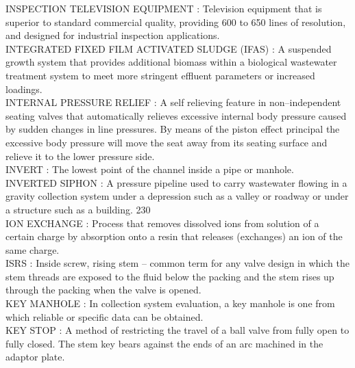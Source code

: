 \vspace{0.15cm}
INSPECTION TELEVISION EQUIPMENT :  Television equipment that is superior to standard commercial quality, providing 600 to 650 lines of resolution, and designed for industrial inspection applications. \\
\vspace{0.15cm}
INTEGRATED FIXED FILM ACTIVATED SLUDGE (IFAS) :   A suspended growth system that provides additional biomass within a biological wastewater treatment system to meet more stringent effluent parameters or increased loadings.\\
\vspace{0.15cm}
INTERNAL PRESSURE RELIEF :   A self relieving feature in non–independent seating valves that automatically relieves excessive internal body pressure caused by sudden changes in line pressures. By means of the piston effect principal the excessive body pressure will move the seat away from its seating surface and relieve it to the lower pressure side.\\
\vspace{0.15cm}
INVERT :  The lowest point of the channel inside a pipe or manhole. \\
\vspace{0.15cm}
INVERTED SIPHON :  A pressure pipeline used to carry wastewater flowing in a gravity collection system under a depression such as a valley or roadway or under a structure such as a building. 230 \\
\vspace{0.15cm}
ION EXCHANGE :  Process that removes dissolved ions from solution of a certain charge by absorption onto a resin that releases (exchanges) an ion of the same charge.\\
\vspace{0.15cm}
ISRS :   Inside screw, rising stem – common term for any valve design in which the stem threads are exposed to the fluid below the packing and the stem rises up through the packing when the valve is opened.\\
\vspace{0.15cm}
KEY MANHOLE :  In collection system evaluation, a key manhole is one from which reliable or specific data can be obtained. \\
\vspace{0.15cm}
KEY STOP :   A method of restricting the travel of a ball valve from fully open to fully closed. The stem key bears against the ends of an arc machined in the adaptor plate.\\
\vspace{0.15cm}
